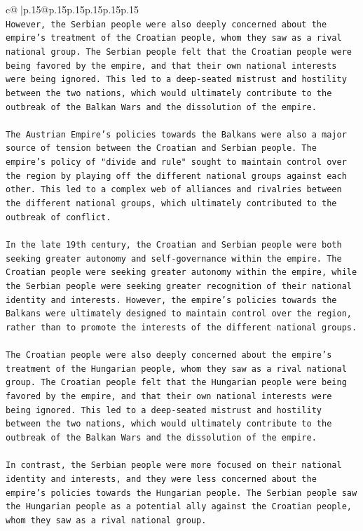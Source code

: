 \documentclass{article}
\begin{document}
{\begin{supertabular}{c@{$\;$}|p{.15\linewidth}@{}p{.15\linewidth}p{.15\linewidth}p{.15\linewidth}p{.15\linewidth}p{.15\linewidth}}
{{{\\ 
\texttt{However, the Serbian people were also deeply concerned about the empire's treatment of the Croatian people, whom they saw as a rival national group. The Serbian people felt that the Croatian people were being favored by the empire, and that their own national interests were being ignored. This led to a deep{-}seated mistrust and hostility between the two nations, which would ultimately contribute to the outbreak of the Balkan Wars and the dissolution of the empire.} \\
\\ 
\texttt{The Austrian Empire's policies towards the Balkans were also a major source of tension between the Croatian and Serbian people. The empire's policy of "divide and rule" sought to maintain control over the region by playing off the different national groups against each other. This led to a complex web of alliances and rivalries between the different national groups, which ultimately contributed to the outbreak of conflict.} \\
\\ 
\texttt{In the late 19th century, the Croatian and Serbian people were both seeking greater autonomy and self{-}governance within the empire. The Croatian people were seeking greater autonomy within the empire, while the Serbian people were seeking greater recognition of their national identity and interests. However, the empire's policies towards the Balkans were ultimately designed to maintain control over the region, rather than to promote the interests of the different national groups.} \\
\\ 
\texttt{The Croatian people were also deeply concerned about the empire's treatment of the Hungarian people, whom they saw as a rival national group. The Croatian people felt that the Hungarian people were being favored by the empire, and that their own national interests were being ignored. This led to a deep{-}seated mistrust and hostility between the two nations, which would ultimately contribute to the outbreak of the Balkan Wars and the dissolution of the empire.} \\
\\ 
\texttt{In contrast, the Serbian people were more focused on their national identity and interests, and they were less concerned about the empire's policies towards the Hungarian people. The Serbian people saw the Hungarian people as a potential ally against the Croatian people, whom they saw as a rival national group.} \\
}}}
\end{supertabular}}
\end{document}
